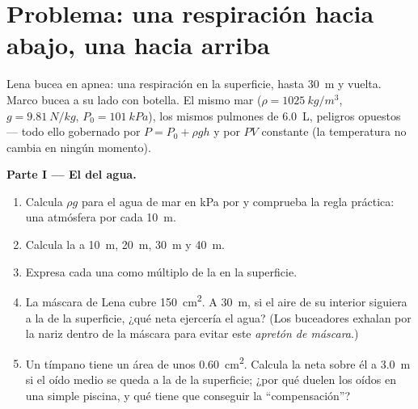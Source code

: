 \section{Problema: una respiración hacia abajo, una hacia arriba}

\begin{problem}
\label{pb:g10:pressure:1}
Lena bucea en apnea: una respiración en la superficie, hasta
\qty{30}{m} y vuelta. Marco bucea a su lado con botella. El mismo mar
($\rho = \qty{1025}{kg/m^3}$, $g = \qty{9.81}{N/kg}$,
$P_0 = \qty{101}{kPa}$), los mismos pulmones de \qty{6.0}{L}, peligros
opuestos --- todo ello gobernado por $P = P_0 + \rho g h$ y por $PV$
constante (la temperatura no cambia en ningún momento).

\medskip
\noindent\textbf{Parte I --- El  del agua.}
\begin{enumerate}
  \item Calcula $\rho g$ para el agua de mar en \unit{kPa} por  y
        comprueba la regla práctica: una atmósfera por cada \qty{10}{m}.
  \item Calcula la  a \qty{10}{m}, \qty{20}{m},
        \qty{30}{m} y \qty{40}{m}.
  \item Expresa cada una como múltiplo de la  en la superficie.
  \item La máscara de Lena cubre \qty{150}{cm^2}. A \qty{30}{m}, si el
        aire de su interior siguiera a la  de la superficie, ¿qué
         neta ejercería el agua? (Los buceadores exhalan por la
        nariz dentro de la máscara para evitar este \emph{apretón de
        máscara}.)
  \item Un tímpano tiene un área de unos \qty{0.60}{cm^2}. Calcula la
         neta sobre él a \qty{3.0}{m} si el oído medio se queda a
        la  de la superficie; ¿por qué duelen los oídos en una
        simple piscina, y qué tiene que conseguir la ``compensación''?
\end{enumerate}


\end{problem}
